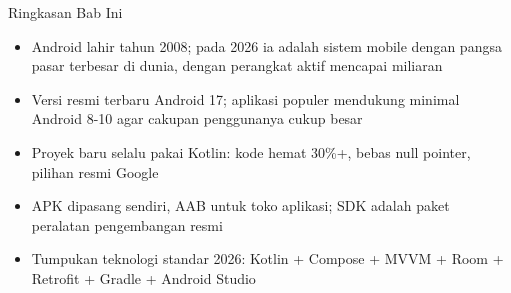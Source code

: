 \begin{tcbsummary}{Ringkasan Bab Ini}
\begin{itemize}
  \item Android lahir tahun 2008; pada 2026 ia adalah sistem mobile dengan pangsa pasar terbesar di dunia, dengan perangkat aktif mencapai miliaran
  \item Versi resmi terbaru Android 17; aplikasi populer mendukung minimal Android 8-10 agar cakupan penggunanya cukup besar
  \item Proyek baru selalu pakai Kotlin: kode hemat 30\%+, bebas null pointer, pilihan resmi Google
  \item APK dipasang sendiri, AAB untuk toko aplikasi; SDK adalah paket peralatan pengembangan resmi
  \item Tumpukan teknologi standar 2026: Kotlin + Compose + MVVM + Room + Retrofit + Gradle + Android Studio
\end{itemize}

\end{tcbsummary}
